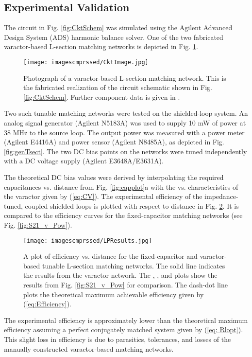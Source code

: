 \documentclass[journal]{IEEEtran}
\begin{document}
\subsection{Experimental Validation}
\label{sec:ExpResults}

The circuit in Fig. \ref{fig:CktSchem} was simulated using the Agilent Advanced Design System (ADS) harmonic balance solver. One of the two fabricated varactor-based L-section matching networks is depicted in Fig. \ref{fig:CktImage}.
\begin{figure}[htbp]
    \centering
    \texttt{[image: imagescmprssed/CktImage.jpg]}
    \caption{Photograph of a varactor-based L-section matching network. This is the fabricated realization of the circuit schematic shown in Fig. \ref{fig:CktSchem}. Further component data is given in \cite{Components}.}
    \label{fig:CktImage}
\end{figure}
Two such tunable matching networks were tested on the shielded-loop system. An analog signal generator (Agilent N5183A) was used to supply 10 mW of power at 38 MHz to the source loop. The output power was measured with a power meter (Agilent E4416A) and power sensor (Agilent N8485A), as depicted in Fig. \ref{fig:genTsect}. The two DC bias points on the networks were tuned independently with a DC voltage supply (Agilent E3648A/E3631A).

The theoretical DC bias values were derived by interpolating the required capacitances vs. distance from Fig. \ref{fig:capplot}a with the  vs.  characteristics of the varactor given by (\ref{eq:CV}). The experimental efficiency of the impedance-tuned, coupled shielded loops is plotted with respect to distance in Fig. \ref{fig:LPResults}. It is compared to the efficiency curves for the fixed-capacitor matching networks (see Fig. \ref{fig:S21_v_Pow}).
\begin{figure}[htbp]
    \centering
    \texttt{[image: imagescmprssed/LPResults.jpg]}
    \caption{A plot of efficiency vs. distance for the fixed-capacitor and varactor-based tunable L-section matching networks. The solid line indicates the results from the varactor network. The , , and  plots show the results from Fig. \ref{fig:S21_v_Pow} for comparison. The dash-dot line plots the theoretical maximum achievable efficiency given by (\ref{eq:Efficiency}).}
    \label{fig:LPResults}
\end{figure}
The experimental efficiency is approximately  lower than the theoretical maximum efficiency assuming a perfect conjugately matched system given by (\ref{eq: Rlopt}). This slight loss in efficiency is due to parasitics, tolerances, and losses of the manually constructed varactor-based matching networks.
\end{document}
